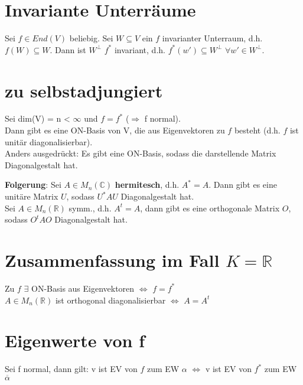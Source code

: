 \section{Invariante Unterräume}
\begin{theorem}
Sei $f \in End(V)$ beliebig. Sei $W \subseteq V$ ein $f$ invarianter Unterraum, d.h. $f(W) \subseteq W$. Dann ist $W^\perp$ $f^*$ invariant, d.h. $f^*(w') \subseteq W^\perp$ $\forall w' \in W^\perp$.
\end{theorem}

\section{zu selbstadjungiert}
\begin{lemma}
Sei dim(V) = n < $\infty$ und $f = f^*$ ($\Rightarrow$ f normal).\\
Dann gibt es eine ON-Basis von V, die aus Eigenvektoren zu $f$ besteht (d.h. $f$ ist unitär diagonalisierbar).\\
Anders ausgedrückt: Es gibt eine ON-Basis, sodass die darstellende Matrix Diagonalgestalt hat.

\textbf{Folgerung}: Sei $A \in M_n(\mathbb{C})$ \textbf{hermitesch}, d.h. $A^*=A$. Dann gibt es eine unitäre Matrix $U$, sodass $U^*AU$ Diagonalgestalt hat.\\
Sei $A \in M_n(\mathbb{R})$ symm., d.h. $A^t=A$, dann gibt es eine orthogonale Matrix $O$, sodass $O^tAO$ Diagonalgestalt hat.
\end{lemma}

\section{Zusammenfassung im Fall $K=\mathbb{R}$}
\begin{lemma}
Zu $f$ $\exists$ ON-Basis aus Eigenvektoren $\Leftrightarrow$ $f = f^*$\\
$A \in M_n(\mathbb{R})$ ist orthogonal diagonalisierbar $\Leftrightarrow$ $A = A^t$
\end{lemma}

\section{Eigenwerte von f}
\begin{theorem}
Sei f normal, dann gilt: v ist EV von $f$  zum EW $\alpha$ $\Leftrightarrow$ v ist EV von $f^*$ zum EW $\overline{\alpha}$
\end{theorem}

